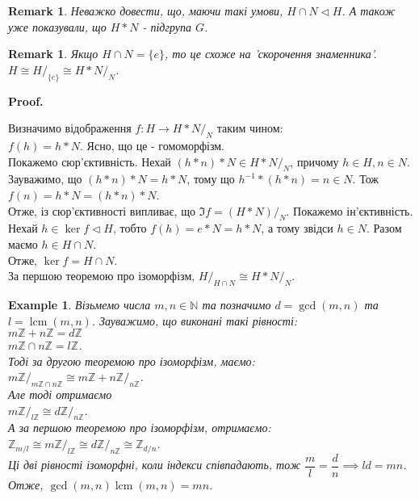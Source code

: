 \documentclass[a4paper, 10pt]{article}
\makeatletter
\theoremstyle{theoremdd}
\theoremstyle{theoremdd}
\theoremstyle{theoremdd}
\theoremstyle{theoremdd}
\theoremstyle{theoremdd}
\newtheorem{example}[theorem]{Example}
\theoremstyle{theoremdd}
\theoremstyle{theoremdd}
\theoremstyle{theoremdd}
\theoremstyle{theoremdd}
\theoremstyle{theoremdd}
\theoremstyle{theoremdd}
\newtheorem{remark}[theorem]{Remark}
\theoremstyle{theoremdd}
\theoremstyle{theoremdd}
\theoremstyle{theoremdd}
\theoremstyle{theoremdd}
\renewenvironment{proof}[1][Proof.\\]{\par
\pushQED{\hfill \qed}%
\normalfont \topsep6\p@\@plus6\p@\relax
\trivlist
\item\relax
{\bfseries
#1\@addpunct{.}}\hspace\labelsep\ignorespaces
}{%
\popQED\endtrivlist\@endpefalse
}
\DeclareMathOperator{\lcm}{lcm}
\makeatother
\begin{document}
\begin{remark}
Неважко довести, що, маючи такі умови, $H \cap N \triangleleft H$. А також уже показували, що $H*N$ - підгрупа $G$.
\end{remark}

\begin{remark}
Якщо $H \cap N = \{e\}$, то це схоже на 'скорочення знаменника'.\\
$H \cong H/_{\{e\}} \cong H*N/_{N}$.
\end{remark}

\begin{proof}
Визначимо відображення $f: H \to H*N/_{N}$ таким чином:\\
$f(h) = h*N$. Ясно, що це - гомоморфізм.\\
Покажемо сюр'єктивність. Нехай $(h*n)*N \in H*N/_{N}$, причому $h \in H, n \in N$. Зауважимо, що $(h*n)*N = h*N$, тому що $h^{-1}*(h*n) = n \in N$. Тож $f(n) = h*N = (h*n)*N$.\\
Отже, із сюр'єктивності випливає, що $\Im f = (H*N)/_N$.
Покажемо ін'єктивність. Нехай $h \in \ker f \triangleleft H$, тобто $f(h) = e*N = h*N$, а тому звідси $h \in N$. Разом маємо $h \in H \cap N$.\\
Отже, $\ker f = H \cap N$.\\
За першою теоремою про ізоморфізм, $H/_{H \cap N} \cong H*N/_{N}$.
\end{proof}

\begin{example}
Візьмемо числа $m,n \in \mathbb{N}$ та позначимо $d = \gcd(m,n)$ та $l = \lcm(m,n)$. Зауважимо, що виконані такі рівності:\\
$m \mathbb{Z} + n \mathbb{Z} = d \mathbb{Z}$\\
$m \mathbb{Z} \cap n \mathbb{Z} = l \mathbb{Z}$.\\
Тоді за другою теоремою про ізоморфізм, маємо:\\
$m \mathbb{Z}/_{m \mathbb{Z} \cap n \mathbb{Z}} \cong m \mathbb{Z} + n \mathbb{Z}/_{n \mathbb{Z}}$.\\
Але тоді отримаємо\\
$m \mathbb{Z}/_{l \mathbb{Z}} \cong d\mathbb{Z}/_{n \mathbb{Z}}$.\\
А за першою теоремою про ізоморфізм, отримаємо:\\
$\mathbb{Z}_{m/l} \cong  m \mathbb{Z}/_{l \mathbb{Z}} \cong d\mathbb{Z}/_{n \mathbb{Z}} \cong \mathbb{Z}_{d/n}$.\\
Ці дві рівності ізоморфні, коли індекси співпадають, тож $\dfrac{m}{l} = \dfrac{d}{n} \implies ld = mn$.\\
Отже, $\gcd(m,n) \lcm(m,n) = mn$.
\end{example}
\end{document}
